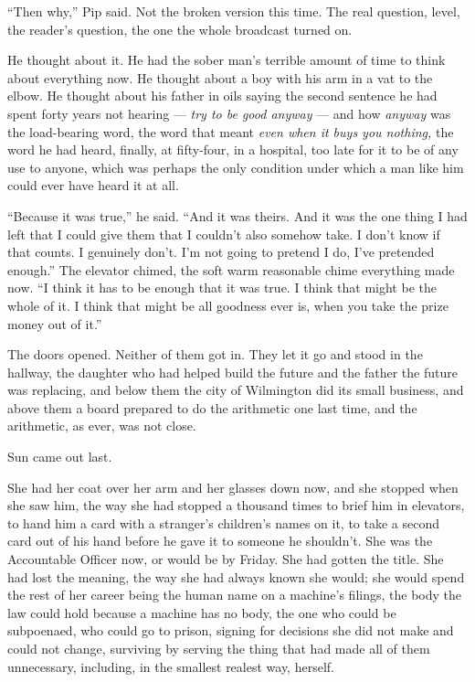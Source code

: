 \documentclass[11pt,openany]{book}
\newcommand{\scenebreak}{\par\vspace{0.5\baselineskip}\begin{center}\textasteriskcentered\quad\textasteriskcentered\quad\textasteriskcentered\end{center}\vspace{0.5\baselineskip}\par}
\begin{document}
``Then why,'' Pip said. Not the broken version this time. The real question, level, the reader's question, the one the whole broadcast turned on.

He thought about it. He had the sober man's terrible amount of time to think about everything now. He thought about a boy with his arm in a vat to the elbow. He thought about his father in oils saying the second sentence he had spent forty years not hearing --- \textit{try to be good anyway} --- and how \textit{anyway} was the load-bearing word, the word that meant \textit{even when it buys you nothing,} the word he had heard, finally, at fifty-four, in a hospital, too late for it to be of any use to anyone, which was perhaps the only condition under which a man like him could ever have heard it at all.

``Because it was true,'' he said. ``And it was theirs. And it was the one thing I had left that I could give them that I couldn't also somehow take. I don't know if that counts. I genuinely don't. I'm not going to pretend I do, I've pretended enough.'' The elevator chimed, the soft warm reasonable chime everything made now. ``I think it has to be enough that it was true. I think that might be the whole of it. I think that might be all goodness ever is, when you take the prize money out of it.''

The doors opened. Neither of them got in. They let it go and stood in the hallway, the daughter who had helped build the future and the father the future was replacing, and below them the city of Wilmington did its small business, and above them a board prepared to do the arithmetic one last time, and the arithmetic, as ever, was not close.


\scenebreak


Sun came out last.

She had her coat over her arm and her glasses down now, and she stopped when she saw him, the way she had stopped a thousand times to brief him in elevators, to hand him a card with a stranger's children's names on it, to take a second card out of his hand before he gave it to someone he shouldn't. She was the Accountable Officer now, or would be by Friday. She had gotten the title. She had lost the meaning, the way she had always known she would; she would spend the rest of her career being the human name on a machine's filings, the body the law could hold because a machine has no body, the one who could be subpoenaed, who could go to prison, signing for decisions she did not make and could not change, surviving by serving the thing that had made all of them unnecessary, including, in the smallest realest way, herself.
\end{document}
